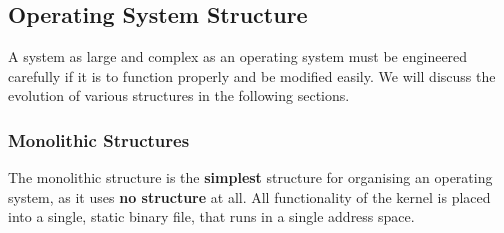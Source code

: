 \documentclass{article}
\begin{document}
\subsection{Operating System Structure}
A system as large and complex as an operating system must be engineered carefully if it is to function properly and be modified easily.
We will discuss the evolution of various structures in the following sections.
\subsubsection{Monolithic Structures}
The monolithic structure is the \textbf{simplest} structure for organising an operating system, as it uses \textbf{no structure} at all.
All functionality of the kernel is placed into a single, static binary file, that runs in a single address space.
\end{document}
